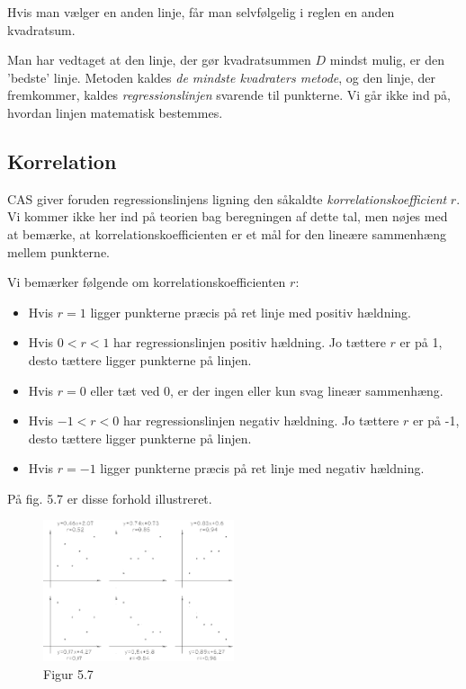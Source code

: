 \documentclass[12pt,oneside,a4paper]{article}
\begin{document}
Hvis man vælger en anden linje, får man selvfølgelig i reglen en anden kvadratsum.

Man har vedtaget at den linje, der gør kvadratsummen $D$ mindst mulig, er den
'bedste' linje. Metoden kaldes {\em de mindste kvadraters metode}, og den linje, der
fremkommer, kaldes {\em regressionslinjen} svarende til punkterne. Vi går ikke ind
på, hvordan linjen matematisk bestemmes. 

\subsection{Korrelation}
CAS giver foruden regressionslinjens ligning den såkaldte {\em
korrelations\-koef\-fi\-cient} $r$. Vi kommer ikke her ind på teorien bag
beregningen af dette tal, men nøjes med at bemærke, at
korrelationskoefficienten er et mål for den lineære sammenhæng mellem
punkterne.

Vi bemærker følgende om korrelationskoefficienten $r$:

\begin{itemize}
    \item Hvis $r = 1$ ligger punkterne præcis på ret linje med positiv hældning.
    \item Hvis $0 < r < 1$ har regressionslinjen positiv hældning. Jo tættere $r$
        er på 1, desto tættere ligger punkterne på linjen.
    \item Hvis $r = 0$ eller tæt ved 0, er der ingen eller kun svag lineær sammenhæng.
    \item Hvis $-1 < r < 0$ har regressionslinjen negativ hældning. Jo tættere $r$
        er på -1, desto tættere ligger punkterne på linjen.
    \item Hvis $r = -1$ ligger punkterne præcis på ret linje med negativ hældning. 
\end{itemize}
På fig. 5.7 er disse forhold illustreret.

\begin{figure}[H]
    \centering
    \includegraphics[width=0.5\textwidth]{fig57}
    \caption{Figur 5.7}
    \label{fig57}
\end{figure}
\end{document}
